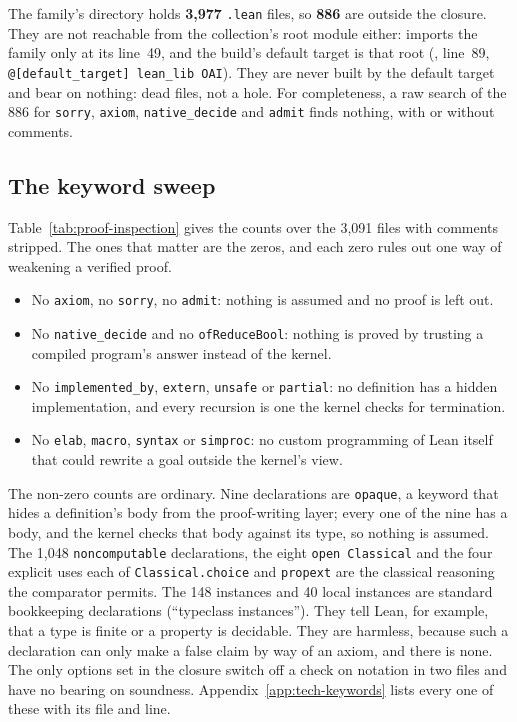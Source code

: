 The family's directory holds \textbf{3,977} \texttt{.lean} files, so
\textbf{886} are outside the closure. They are not reachable from the
collection's root module either:  imports the
family only at its line~49, and the build's default target is that root
(, line~89,
\texttt{@[default\_target] lean\_lib OAI}). They are never built by the
default target and bear on nothing: dead files, not a hole. For
completeness, a raw search of the 886 for \texttt{sorry},
\texttt{axiom}, \texttt{native\_decide} and \texttt{admit} finds
nothing, with or without comments.

\subsection{The keyword sweep}
\label{sec:proof-keywords}

Table~\ref{tab:proof-inspection} gives the counts over the 3,091 files
with comments stripped. The ones that matter are the zeros, and each
zero rules out one way of weakening a verified proof.

\begin{itemize}
\item No \texttt{axiom}, no \texttt{sorry}, no \texttt{admit}: nothing
  is assumed and no proof is left out.
\item No \texttt{native\_decide} and no \texttt{ofReduceBool}: nothing is
  proved by trusting a compiled program's answer instead of the kernel.
\item No \texttt{implemented\_by}, \texttt{extern}, \texttt{unsafe} or
  \texttt{partial}: no definition has a hidden implementation, and every
  recursion is one the kernel checks for termination.
\item No \texttt{elab}, \texttt{macro}, \texttt{syntax} or
  \texttt{simproc}: no custom programming of Lean itself that could
  rewrite a goal outside the kernel's view.
\end{itemize}

The non-zero counts are ordinary. Nine declarations are \texttt{opaque},
a keyword that hides a definition's body from the proof-writing layer;
every one of the nine has a body, and the kernel checks that body
against its type, so nothing is assumed. The 1,048 \texttt{noncomputable}
declarations, the eight \texttt{open Classical} and the four explicit
uses each of \texttt{Classical.choice} and \texttt{propext} are the
classical reasoning the comparator permits. The 148 instances and 40 local instances are standard bookkeeping declarations (``typeclass instances''). They tell Lean, for example, that a type is finite or a property is decidable. They are harmless, because such a declaration can only make a false claim by way of an axiom, and there is none. The only options set in the closure switch off a check on notation in two files and have no bearing on soundness.
Appendix~\ref{app:tech-keywords} lists every one of these with its file
and line.

